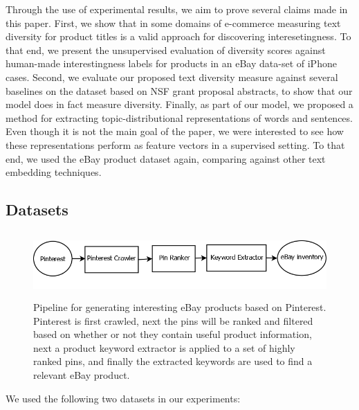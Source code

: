 Through the use of experimental results, we aim to prove several
claims made in this paper. First, we show that in some domains of
e-commerce measuring text diversity for product titles is a valid
approach for discovering interesetingness. To that end, we present the
unsupervised evaluation of diversity scores against human-made
interestingness labels for products in an eBay data-set of iPhone
cases. Second, we evaluate our proposed text diversity measure against
several baselines on the dataset based on NSF grant proposal
abstracts, to show that our model does in fact measure
diversity. Finally, as part of our model, we proposed a method for
extracting topic-distributional representations of words and
sentences. Even though it is not the main goal of the paper, we were
interested to see how these representations perform as feature vectors
in a supervised setting. To that end, we used the eBay product
dataset again, comparing against other text embedding techniques.

\subsection{Datasets}
\label{sec:datasets}


\begin{figure}
\begin{center}
\includegraphics[height=2.5cm]{figures/Pipeline.png}
\caption{Pipeline for generating interesting eBay products based on Pinterest. Pinterest is first crawled, next the pins will be ranked and filtered based on whether or not they contain useful product information, next a product keyword extractor is applied to a set of highly ranked pins, and finally the extracted keywords are used to find a relevant eBay product.}
\end{center}
\label{fig:pinterest-pipeline}
\end{figure}

We used the following two datasets in our experiments: 

